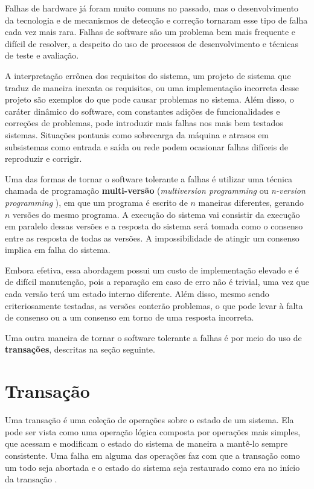 \documentclass[11pt,twoside,a4paper]{book}
\begin{document}
Falhas de hardware já foram muito comuns no passado, mas o desenvolvimento da tecnologia e de mecanismos de detecção e correção tornaram esse tipo de falha cada vez mais rara. Falhas de software são um problema bem mais frequente e difícil de resolver, a despeito do uso de processos de desenvolvimento e técnicas de teste e avaliação.

A interpretação errônea dos requisitos do sistema, um projeto de sistema que traduz de maneira inexata os requisitos, ou uma implementação incorreta desse projeto são exemplos do que pode causar problemas no sistema. Além disso, o caráter dinâmico do software, com constantes adições de funcionalidades e correções de problemas, pode introduzir mais falhas nos mais bem testados sistemas. Situações pontuais como sobrecarga da máquina e atrasos em subsistemas como entrada e saída ou rede podem ocasionar falhas difíceis de reproduzir e corrigir.

Uma das formas de tornar o software tolerante a falhas é utilizar uma técnica chamada de programação \textbf{multi-versão} (\emph{multiversion programming} ou \emph{n-version programming} \cite{n_version}), em que um programa é escrito de $n$ maneiras diferentes, gerando $n$ versões do mesmo programa. A execução do sistema vai consistir da execução em paralelo dessas versões e a resposta do sistema será tomada como o consenso entre as resposta de todas as versões. A impossibilidade de atingir um consenso implica em falha do sistema.

Embora efetiva, essa abordagem possui um custo de implementação elevado e é de difícil manutenção, pois a reparação em caso de erro não é trivial, uma vez que cada versão terá um estado interno diferente. Além disso, mesmo sendo criteriosamente testadas, as versões conterão problemas, o que pode levar à falta de consenso ou a um consenso em torno de uma resposta incorreta.

Uma outra maneira de tornar o software tolerante a falhas é por meio do uso de \textbf{transações}, descritas na seção seguinte.

\section{Transação}
\label{sec:transacao}
Uma transação é uma coleção de operações sobre o estado de um sistema. Ela pode ser vista como uma operação lógica composta por operações mais simples, que acessam e modificam o estado do sistema de maneira a mantê-lo sempre consistente. Uma falha em alguma das operações faz com que a transação como um todo seja abortada e o estado do sistema seja restaurado como era no início da transação \cite{garcia-molina, vaca, gray}.
\end{document}
